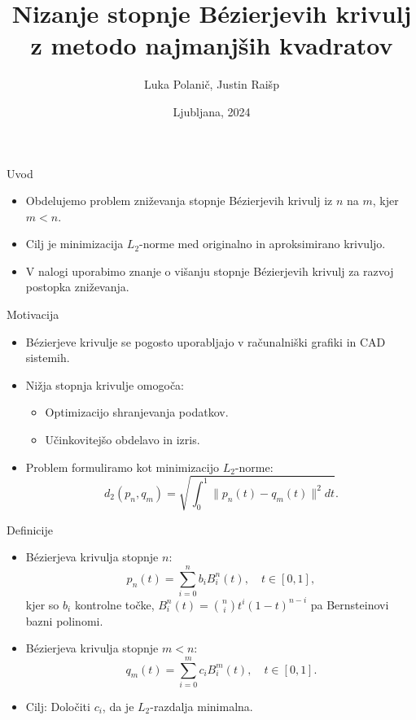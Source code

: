 \documentclass{beamer}
\title[Nizanje stopnje Bézierjevih krivulj]{Nizanje stopnje Bézierjevih krivulj z metodo najmanjših kvadratov}
\author{Luka Polanič, Justin Raišp}
\date{Ljubljana, 2024}
\begin{document}
\begin{frame}
    \titlepage
\end{frame}

\begin{frame}{Uvod}
    \begin{itemize}
        \item Obdelujemo problem zniževanja stopnje Bézierjevih krivulj iz $n$ na $m$, kjer $m < n$.
        \item Cilj je minimizacija $L_2$-norme med originalno in aproksimirano krivuljo.
        \item V nalogi uporabimo znanje o višanju stopnje Bézierjevih krivulj za razvoj postopka zniževanja.
    \end{itemize}
\end{frame}

\begin{frame}{Motivacija}
    \begin{itemize}
        \item Bézierjeve krivulje se pogosto uporabljajo v računalniški grafiki in CAD sistemih.
        \item Nižja stopnja krivulje omogoča:
        \begin{itemize}
            \item Optimizacijo shranjevanja podatkov.
            \item Učinkovitejšo obdelavo in izris.
        \end{itemize}
        \item Problem formuliramo kot minimizacijo $L_2$-norme:
        \[ d_2(p_n, q_m) = \sqrt{\int_0^1 \|p_n(t) - q_m(t)\|^2 dt}. \]
    \end{itemize}
\end{frame}

\begin{frame}{Definicije}
    \begin{itemize}
        \item Bézierjeva krivulja stopnje $n$:
        \[ p_n(t) = \sum_{i=0}^n b_i B_i^n(t), \quad t \in [0, 1], \]
        kjer so $b_i$ kontrolne točke, $B_i^n(t) = \binom{n}{i} t^i (1-t)^{n-i}$ pa Bernsteinovi bazni polinomi.
        \item Bézierjeva krivulja stopnje $m < n$:
        \[ q_m(t) = \sum_{i=0}^m c_i B_i^m(t), \quad t \in [0, 1]. \]
        \item Cilj: Določiti $c_i$, da je $L_2$-razdalja minimalna.
    \end{itemize}
\end{frame}
\end{document}
